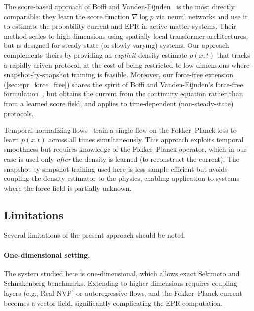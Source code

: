 The score-based approach of Boffi and Vanden-Eijnden~\cite{Boffi2024,Boffi2022} is the most directly comparable: they learn the score function $\nabla\log p$ via neural networks and use it to estimate the probability current and EPR in active matter systems.
Their method scales to high dimensions using spatially-local transformer architectures, but is designed for steady-state (or slowly varying) systems.
Our approach complements theirs by providing an \emph{explicit} density estimate $p(x,t)$ that tracks a rapidly driven protocol, at the cost of being restricted to low dimensions where snapshot-by-snapshot training is feasible.
Moreover, our force-free extension (\cref{sec:epr_force_free}) shares the spirit of Boffi and Vanden-Eijnden's force-free formulation~\cite{Boffi2024}, but obtains the current from the continuity equation rather than from a learned score field, and applies to time-dependent (non-steady-state) protocols.

Temporal normalizing flows~\cite{Feng2022} train a single flow on the Fokker--Planck loss to learn $p(x,t)$ across all times simultaneously.
This approach exploits temporal smoothness but requires knowledge of the Fokker--Planck operator, which in our case is used only \emph{after} the density is learned (to reconstruct the current).
The snapshot-by-snapshot training used here is less sample-efficient but avoids coupling the density estimator to the physics, enabling application to systems where the force field is partially unknown.

\subsection{Limitations}

Several limitations of the present approach should be noted.

\paragraph{One-dimensional setting.}
The system studied here is one-dimensional, which allows exact Sekimoto and Schnakenberg benchmarks.
Extending to higher dimensions requires coupling layers (e.g., Real-NVP) or autoregressive flows, and the Fokker--Planck current becomes a vector field, significantly complicating the EPR computation.

